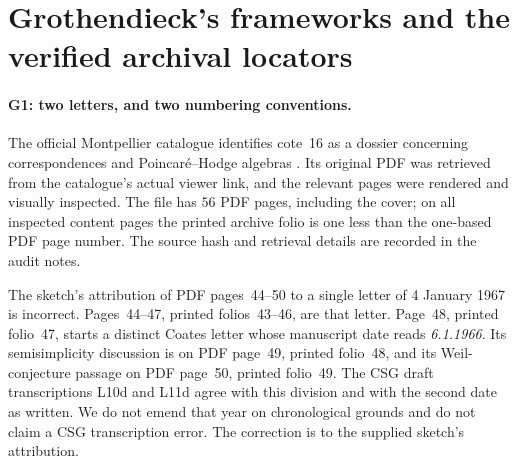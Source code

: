 \section{Grothendieck's frameworks and the verified archival locators}\label{sec:archive}
\paragraph{G1: two letters, and two numbering conventions.}
The official Montpellier catalogue identifies cote~16 as a dossier concerning correspondences and Poincar\'e--Hodge algebras \citep{Groth16}. Its original PDF was retrieved from the catalogue's actual viewer link, and the relevant pages were rendered and visually inspected. The file has $56$ PDF pages, including the cover; on all inspected content pages the printed archive folio is one less than the one-based PDF page number. The source hash and retrieval details are recorded in the audit notes.

The sketch's attribution of PDF pages~44--50 to a single letter of 4 January 1967 is incorrect. Pages~44--47, printed folios~43--46, are that letter. Page~48, printed folio~47, starts a distinct Coates letter whose manuscript date reads \emph{6.1.1966}. Its semisimplicity discussion is on PDF page~49, printed folio~48, and its Weil-conjecture passage on PDF page~50, printed folio~49. The CSG draft transcriptions L10d and L11d agree with this division and with the second date as written. We do not emend that year on chronological grounds and do not claim a CSG transcription error. The correction is to the supplied sketch's attribution.

